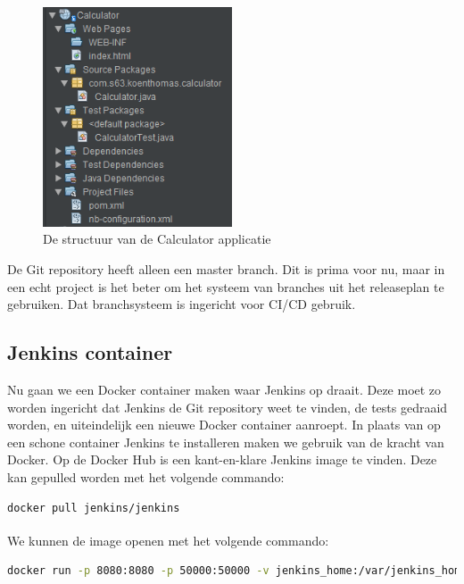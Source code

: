 \documentclass[12pt]{article}
\begin{document}
\begin{figure}[H]
	\begin{center}
		\includegraphics[width=0.5\textwidth]{images/CalculatorApplication.png}
		\caption{De structuur van de Calculator applicatie\label{fig:calculator_app}}
	\end{center}
\end{figure}

De Git repository heeft alleen een master branch. Dit is prima voor nu, maar in een echt project is het beter om het systeem van branches uit het releaseplan te gebruiken. Dat branchsysteem is ingericht voor CI/CD gebruik.

\subsection{Jenkins container}
Nu gaan we een Docker container maken waar Jenkins op draait. Deze moet zo worden ingericht dat Jenkins de Git repository weet te vinden, de tests gedraaid worden, en uiteindelijk een nieuwe Docker container aanroept.
\linebreak
In plaats van op een schone container Jenkins te installeren maken we gebruik van de kracht van Docker. Op de Docker Hub is een kant-en-klare Jenkins image te vinden. Deze kan gepulled worden met het volgende commando:

\begin{lstlisting}[language=Bash]
docker pull jenkins/jenkins
\end{lstlisting}

\noindent We kunnen de image openen met het volgende commando\textsuperscript{\cite{jenkins_documentation}}:

\begin{lstlisting}[language=Bash]
docker run -p 8080:8080 -p 50000:50000 -v jenkins_home:/var/jenkins_home jenkins/jenkins:latest
\end{lstlisting}
\end{document}
